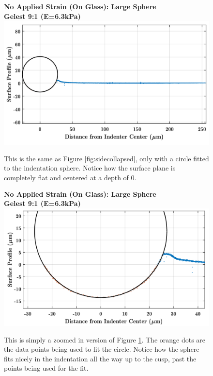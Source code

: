 \begin{figure}[h!]
	\centering
	\large \textbf{No Applied Strain (On Glass): Large Sphere}\\ \vspace{.4em}
	\large \textbf{Gelest 9:1 (E=6.3kPa)}
	\includegraphics[width=\linewidth]{Chapters/Figures/sphere011_ia/circle_fit}
	\caption[Circle Fit]{This is the same as Figure \ref{fig:sidecollapsed}, only with a circle fitted to the indentation sphere. Notice how the surface plane is completely flat and centered at a depth of 0.}
	\label{fig:circlefit}
\end{figure}


\begin{figure}[h!]
	\centering
	{\large \textbf{No Applied Strain (On Glass): Large Sphere}}\\ \vspace{.4 em}
	{\large \textbf{Gelest 9:1 (E=6.3kPa)}}
	\includegraphics[width=\linewidth]{Chapters/Figures/sphere011_ia/circle_fit_zoomed}
	\caption[Circle Fit Zoomed]{This is simply a zoomed in version of Figure \ref{fig:circlefit}. The orange dots are the data points being used to fit the circle. Notice how the sphere fits nicely in the indentation all the way up to the cusp, past the points being used for the fit.}
	\label{fig:circlefitzoomed}
\end{figure}

